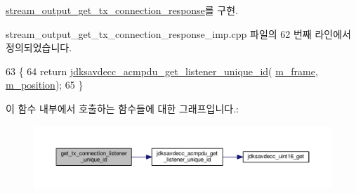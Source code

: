 \hyperlink{classavdecc__lib_1_1stream__output__get__tx__connection__response_a2f904ba7079c467dd2cbb6351d972a2e}{stream\+\_\+output\+\_\+get\+\_\+tx\+\_\+connection\+\_\+response}를 구현.



stream\+\_\+output\+\_\+get\+\_\+tx\+\_\+connection\+\_\+response\+\_\+imp.\+cpp 파일의 62 번째 라인에서 정의되었습니다.


\begin{DoxyCode}
63 \{
64     \textcolor{keywordflow}{return} \hyperlink{group__acmpdu_ga36867bfc130619cbea38caa3ce54bc89}{jdksavdecc\_acmpdu\_get\_listener\_unique\_id}(
      \hyperlink{classavdecc__lib_1_1stream__output__get__tx__connection__response__imp_a50417969cf438e7c8d698726bbbe2ff9}{m\_frame}, \hyperlink{classavdecc__lib_1_1stream__output__get__tx__connection__response__imp_af5e691c4a8a0feb07f48440b321206cd}{m\_position});
65 \}
\end{DoxyCode}


이 함수 내부에서 호출하는 함수들에 대한 그래프입니다.\+:
\nopagebreak
\begin{figure}[H]
\begin{center}
\leavevmode
\includegraphics[width=350pt]{classavdecc__lib_1_1stream__output__get__tx__connection__response__imp_a5f1b3ceffcc6d3995d774b1a2278d54c_cgraph}
\end{center}
\end{figure}


